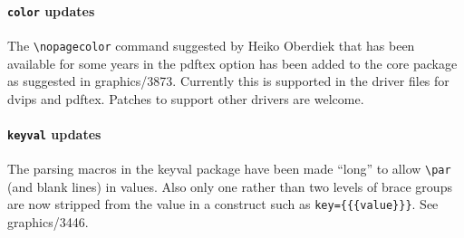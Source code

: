 \documentclass{ltnews}
\begin{document}
\paragraph{\texttt{color} updates}
The \verb|\nopagecolor| command suggested by Heiko Oberdiek that has been available 
for some years in the \textsf{pdftex} option has been added to the core package as suggested in 
graphics/3873. Currently this is supported in the driver files for \textsf{dvips} and \textsf{pdftex}.
Patches to support other drivers are welcome.

\paragraph{\texttt{keyval} updates}
The parsing macros in the \textsf{keyval} package have been made ``long'' to allow \verb|\par| (and blank lines)
in values. Also only one rather than two levels of brace groups are now stripped from the value in a construct such as 
\verb|key={{{value}}}|. See graphics/3446.
\end{document}
